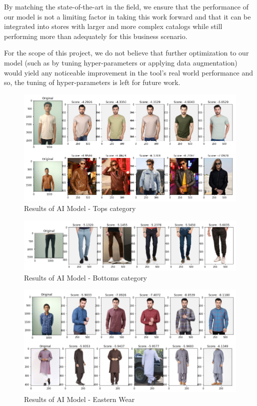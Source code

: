 By matching the state-of-the-art in the field, we ensure that the performance of our model is not a limiting factor in taking this work forward and that it can be integrated into stores with larger and more complex catalogs while still performing more than adequately for this business scenario.

For the scope of this project, we do not believe that further optimization to our model (such as by tuning hyper-parameters or applying data augmentation) would yield any noticeable improvement in the tool’s real world performance and so, the tuning of hyper-parameters is left for future work.


\begin{figure}[H]
\includegraphics[width=12cm]{images/Recommendations1.PNG} 
\centering
\caption{Results of AI Model - Tops category}
\label{architecture}
\end{figure}

\begin{figure}[H]
\includegraphics[width=12cm]{images/Recommendations2.PNG} 
\centering
\caption{Results of AI Model - Bottoms category}
\label{architecture}
\end{figure}

\begin{figure}[H]
\includegraphics[width=12cm]{images/Recommendations3.PNG} 
\centering
\caption{Results of AI Model - Eastern Wear}
\label{architecture}
\end{figure}

